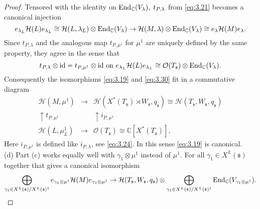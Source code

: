 \documentclass[11pt]{amsart}
\theoremstyle{definition}
\begin{document}
\begin{proof}
Tensored with the identity on ${{\rm End}}_{\mathbb C} (V_\lambda) ,\; t_{P,\lambda}$ 
from \eqref{eq:3.21} becomes a canonical injection
\begin{equation}\label{eq:3.92}
e_{\lambda_L} {{\mathcal H}} (L) e_{\lambda_L} \cong {{\mathcal H}} (L,\lambda_L) \otimes {{\rm End}}_{\mathbb C} (V_{\lambda}) 
\to {{\mathcal H}} (M,\lambda) \otimes {{\rm End}}_{\mathbb C} (V_{\lambda}) \cong e_{\lambda} {{\mathcal H}} (M) e_{\lambda} .
\end{equation}
Since $t_{P,\lambda}$ and the analogous map $t_{P,\mu^1}$ for $\mu^1$ are
uniquely defined by the same property, they agree in the sense that
\begin{equation}\label{eq:3.22}
t_{P,\lambda} \otimes \text{id} = t_{P,\mu^1} \otimes \text{id   on   }
e_{\lambda_L} {{\mathcal H}} (L) e_{\lambda_L} \cong \mathcal O (T_{{\mathfrak s}}) \otimes {{\rm End}}_{\mathbb C} (V_\lambda) . 
\end{equation}
Consequently the isomorphisms \eqref{eq:3.19} and \eqref{eq:3.30} fit in a commutative
diagram
\begin{equation}\label{eq:3.29}
\begin{array}{ccc}
{{\mathcal H}} (M,\mu^1) & \to & {{\mathcal H}} (X^* (T_{{\mathfrak s}}) \rtimes W_{{\mathfrak s}} ,q_{{\mathfrak s}}) \cong
{{\mathcal H}} (T_{{\mathfrak s}}, W_{{\mathfrak s}} ,q_{{\mathfrak s}}) \\
 \uparrow {\scriptstyle t_{P,\mu^1}} & & \uparrow \scriptstyle{i_{P,\mu^1}} \\
{{\mathcal H}} (L,\mu_L^1) & \to & \mathcal O (T_{{\mathfrak s}}) \cong {\mathbb C} [X^* (T_{{\mathfrak s}})] ,
\end{array}
\end{equation}
Here $i_{P,\mu^1}$ is defined like $i_{P,\lambda}$, see \eqref{eq:3.24}. 
In this sense \eqref{eq:3.19} is canonical.\\
(d) Part (c) works equally well with $\gamma_1 \otimes \mu^1$ instead of $\mu^1$. 
For all $\gamma_1 \in X^L ({{\mathfrak s}})$ together that gives a canonical isomorphism 
\begin{equation}\label{eq:4.84}
\bigoplus_{\gamma_1 \in X^L ({{\mathfrak s}}) / X^L ({{\mathfrak s}})^1} e_{\gamma_1 \otimes \mu^1} {{\mathcal H}} (M) 
e_{\gamma_1 \otimes \mu^1} \to {{\mathcal H}} (T_{{\mathfrak s}}, W_{{\mathfrak s}}, q_{{\mathfrak s}}) \otimes 
\bigoplus_{\gamma_1 \in X^L ({{\mathfrak s}}) / X^L ({{\mathfrak s}})^1} {{\rm End}}_{\mathbb C} (V_{\gamma_1 \otimes \mu^1}) .
\end{equation}

\end{proof}
\end{document}
